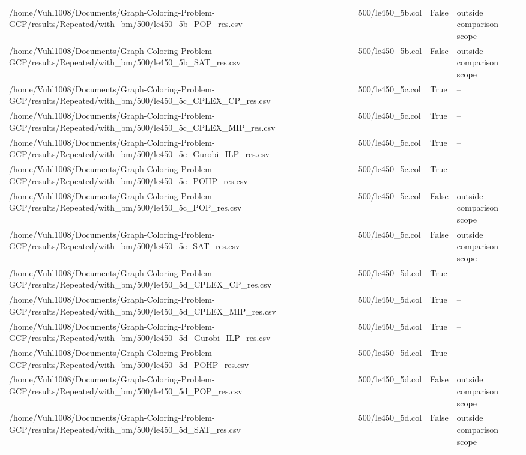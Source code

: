 \begin{table}[htbp]
\begin{tabular}{llll}
/home/Vuhl1008/Documents/Graph-Coloring-Problem-GCP/results/Repeated/with\_bm/500/le450\_5b\_POP\_res.csv & 500/le450\_5b.col & False & outside comparison scope \\
/home/Vuhl1008/Documents/Graph-Coloring-Problem-GCP/results/Repeated/with\_bm/500/le450\_5b\_SAT\_res.csv & 500/le450\_5b.col & False & outside comparison scope \\
/home/Vuhl1008/Documents/Graph-Coloring-Problem-GCP/results/Repeated/with\_bm/500/le450\_5c\_CPLEX\_CP\_res.csv & 500/le450\_5c.col & True & -- \\
/home/Vuhl1008/Documents/Graph-Coloring-Problem-GCP/results/Repeated/with\_bm/500/le450\_5c\_CPLEX\_MIP\_res.csv & 500/le450\_5c.col & True & -- \\
/home/Vuhl1008/Documents/Graph-Coloring-Problem-GCP/results/Repeated/with\_bm/500/le450\_5c\_Gurobi\_ILP\_res.csv & 500/le450\_5c.col & True & -- \\
/home/Vuhl1008/Documents/Graph-Coloring-Problem-GCP/results/Repeated/with\_bm/500/le450\_5c\_POHP\_res.csv & 500/le450\_5c.col & True & -- \\
/home/Vuhl1008/Documents/Graph-Coloring-Problem-GCP/results/Repeated/with\_bm/500/le450\_5c\_POP\_res.csv & 500/le450\_5c.col & False & outside comparison scope \\
/home/Vuhl1008/Documents/Graph-Coloring-Problem-GCP/results/Repeated/with\_bm/500/le450\_5c\_SAT\_res.csv & 500/le450\_5c.col & False & outside comparison scope \\
/home/Vuhl1008/Documents/Graph-Coloring-Problem-GCP/results/Repeated/with\_bm/500/le450\_5d\_CPLEX\_CP\_res.csv & 500/le450\_5d.col & True & -- \\
/home/Vuhl1008/Documents/Graph-Coloring-Problem-GCP/results/Repeated/with\_bm/500/le450\_5d\_CPLEX\_MIP\_res.csv & 500/le450\_5d.col & True & -- \\
/home/Vuhl1008/Documents/Graph-Coloring-Problem-GCP/results/Repeated/with\_bm/500/le450\_5d\_Gurobi\_ILP\_res.csv & 500/le450\_5d.col & True & -- \\
/home/Vuhl1008/Documents/Graph-Coloring-Problem-GCP/results/Repeated/with\_bm/500/le450\_5d\_POHP\_res.csv & 500/le450\_5d.col & True & -- \\
/home/Vuhl1008/Documents/Graph-Coloring-Problem-GCP/results/Repeated/with\_bm/500/le450\_5d\_POP\_res.csv & 500/le450\_5d.col & False & outside comparison scope \\
/home/Vuhl1008/Documents/Graph-Coloring-Problem-GCP/results/Repeated/with\_bm/500/le450\_5d\_SAT\_res.csv & 500/le450\_5d.col & False & outside comparison scope \\

\end{tabular}
\end{table}
